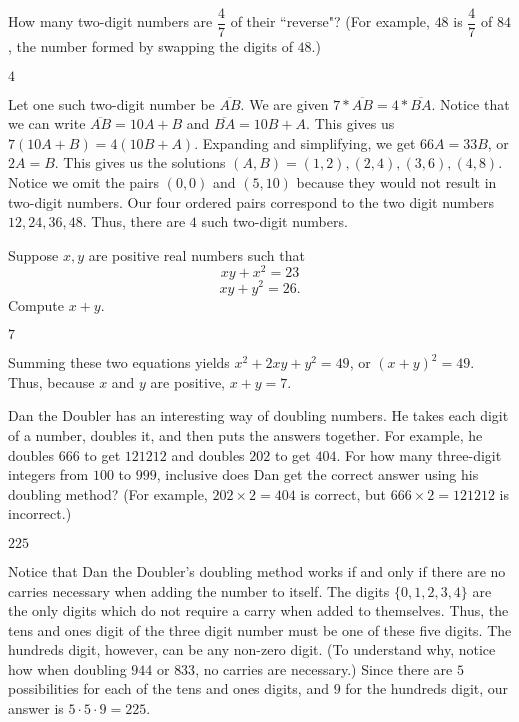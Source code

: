 \documentclass{article}
\begin{document}
\begin{problem}
How many two-digit numbers are $\dfrac{4}{7}$ of their ``reverse"? (For example, $48$ is $\dfrac{4}{7}$ of $84$, the number formed by swapping the digits of $48$.)
\end{problem}
\begin{answer}
$4$
\end{answer}
\begin{solution}
Let one such two-digit number be $\overline{AB}$. We are given $7*\overline{AB} = 4*\overline{BA}$. Notice that we can write $\overline{AB} = 10A+B$ and $\overline{BA} = 10B + A$. This gives us $7(10A + B) = 4(10B + A)$. Expanding and simplifying, we get $66A = 33B$, or $2A = B$. This gives us the solutions $(A, B) = (1, 2), (2, 4), (3, 6), (4, 8)$. Notice we omit the pairs $(0, 0)$ and $(5, 10)$ because they would not result in two-digit numbers. Our four ordered pairs correspond to the two digit numbers $12, 24, 36, 48$. Thus, there are $\boxed{4}$ such two-digit numbers. 
\end{solution}

\begin{problem}
Suppose $x,y$ are positive real numbers such that \[ xy + x^2 = 23 \]  \[ xy + y^2 = 26.\] Compute $x+y$.
\end{problem}
\begin{answer}
$7$
\end{answer}
\begin{solution}
Summing these two equations yields $x^2 + 2xy + y^2 = 49$, or $(x+y)^2 = 49$. Thus, because $x$ and $y$ are positive, $x+y = \boxed{7}$.
\end{solution}

\begin{problem}
Dan the Doubler has an interesting way of doubling numbers. He takes each digit of a number, doubles it, and then puts the answers together. For example, he doubles $666$ to get $121212$ and doubles $202$ to get $404$. For how many three-digit integers from $100$ to $999$, inclusive does Dan get the correct answer using his doubling method? (For example, $202 \times 2 = 404$ is correct, but $666 \times 2 = 121212$ is incorrect.)
\end{problem}
\begin{answer}
$225$
\end{answer}
\begin{solution}
Notice that Dan the Doubler's doubling method works if and only if there are no carries necessary when adding the number to itself. The digits $\{0, 1, 2, 3, 4\}$ are the only digits which do not require a carry when added to themselves. Thus, the tens and ones digit of the three digit number must be one of these five digits. The hundreds digit, however, can be any non-zero digit. (To understand why, notice how when doubling $944$ or $833$, no carries are necessary.) Since there are $5$ possibilities for each of the tens and ones digits, and $9$ for the hundreds digit, our answer is $5 \cdot 5 \cdot 9 = \boxed{225}$.
\end{solution}
\end{document}
